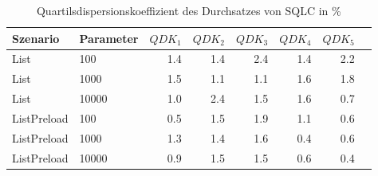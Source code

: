 
\begin{table}[ht]
\setlength{\extrarowheight}{-1pt}
\centering
\caption{Quartilsdispersionskoeffizient des Durchsatzes von SQLC in \%}
\begin{tabular}{llrrrrrr}
\toprule
Szenario & Parameter & ${QDK_1}$ & ${QDK_2}$ & ${QDK_3}$& ${QDK_4}$ & ${QDK_5}$ \\
\midrule
	List & 100 &  1.4 &  1.4 & \cellcolor{red!11}  2.4 &  1.4 & \cellcolor{red!11}  2.2 \\
	List & 1000 &  1.5 &  1.1 &  1.1 &  1.6 &  1.8 \\
	List & 10000 &  1.0 & \cellcolor{red!11}  2.4 &  1.5 &  1.6 &  0.7 \\
	ListPreload & 100 &  0.5 &  1.5 &  1.9 &  1.1 &  0.6 \\
	ListPreload & 1000 &  1.3 &  1.4 &  1.6 &  0.4 &  0.6 \\
	ListPreload & 10000 &  0.9 &  1.5 &  1.5 &  0.6 &  0.4 \\
\bottomrule
\end{tabular}
\label{tab:quartilsdispersionskoeffizient_durchsatz_sqlc}
\end{table}
	